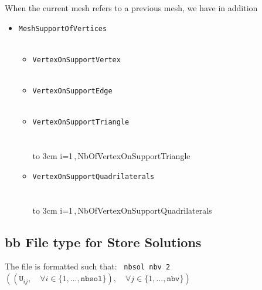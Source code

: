 \documentclass[a4paper,twoside,12pt]{book}
\begin{document}
When the current mesh refers to a previous mesh, we have in addition

\small
\begin{itemize}
\item {\tt MeshSupportOfVertices} \\
 \\
\begin{itemize}

\item {\tt VertexOnSupportVertex} \\
   \\

\item {\tt VertexOnSupportEdge} \\
   \\

\item {\tt VertexOnSupportTriangle} \\
   \\
{\\ \hbox to 3cm {} i=1\,,\,{NbOfVertexOnSupportTriangle}}


\item {\tt VertexOnSupportQuadrilaterals} \\
   \\
{\\ \hbox to 3cm {} i=1\,,\,{NbOfVertexOnSupportQuadrilaterals}}


\end{itemize}

\end{itemize}
\normalsize



\subsection {bb File type for Store Solutions}
The file is formatted such that:
{\tt {} nbsol nbv 2
  $\left(\left(\mathtt{U}_{ij}, \quad \forall i \in \{1,...,\mathtt{nbsol}\}\right), \quad \forall j \in \{1,...,\mathtt{nbv}\}\right)$
 }
\end{document}

